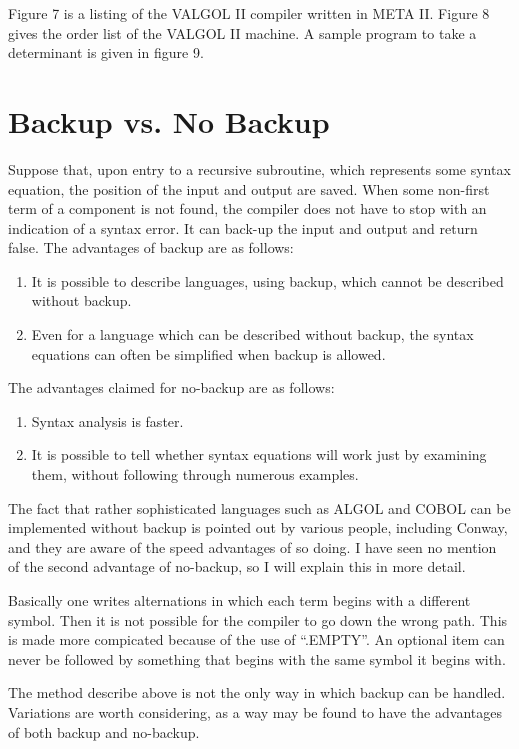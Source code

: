 \documentclass[twocolumn]{article}
\begin{document}
Figure 7 is a listing of the VALGOL II compiler written in META II.
Figure 8 gives the order list of the VALGOL II machine.
A sample program to take a determinant is given in figure 9.

\section{Backup vs. No Backup}

Suppose that, upon entry to a recursive subroutine, which represents some
syntax equation, the position of the input and output are saved.
When some non-first term of a component is not found, the compiler does not
have to stop with an indication of a syntax error.
It can back-up the input and output and return false.
The advantages of backup are as follows:

\begin{enumerate}
\item It is possible to describe languages, using backup, which cannot be
described without backup.
\item Even for a language which can be described without backup, the syntax
equations can often be simplified when backup is allowed.
\end{enumerate}

The advantages claimed for no-backup are as follows:

\begin{enumerate}
\item Syntax analysis is faster.
\item It is possible to tell whether syntax equations will work just by
examining them, without following through numerous examples.
\end{enumerate}

The fact that rather sophisticated languages such as ALGOL and COBOL can be
implemented without backup is pointed out by various people, including 
Conway, and they are aware of the speed advantages of so doing.
I have seen no mention of the second advantage of no-backup, so I will explain
this in more detail.

Basically one writes alternations in which each term begins with a different
symbol.
Then it is not possible for the compiler to go down the wrong path.
This is made more compicated because of the use of ``.EMPTY''.
An optional item can never be followed by something that begins with
the same symbol it begins with.

The method describe above is not the only way in which backup can be handled.
Variations are worth considering, as a way may be found to have the advantages
of both backup and no-backup.
\end{document}
